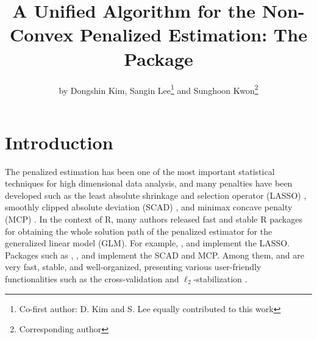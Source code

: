\title{A Unified Algorithm for the Non-Convex Penalized Estimation: The  Package}
\author{by Dongshin Kim, Sangin Lee\footnote{Co-first author: D. Kim and S. Lee equally contributed to this work} and Sunghoon Kwon\footnote{Corresponding author}}

\maketitle


\section{Introduction}

The penalized estimation has been one of the most important statistical techniques for high dimensional data analysis,
and many penalties have been developed such as the least absolute shrinkage and selection operator (LASSO) \citep{tibshirani1996regression},
smoothly clipped absolute deviation (SCAD) \citep{fan2001variable}, and minimax concave penalty (MCP) \citep{zhang2010nearly}.
In the context of R, many authors released fast and stable R packages
for obtaining the whole solution path of the penalized estimator for the generalized linear model (GLM).
For example,
 \citep{efron2004least},
 \citep{park2007l1} and
 \citep{friedman2007pathwise} implement the LASSO.
Packages such as
 \citep{zhang2010nearly},
 \citep{mazumder2011sparsenet},
 \citep{jiang2014majorization} and
 \citep{breheny2011coordinate} implement the SCAD and MCP.
Among them,  and  are very fast, stable, and well-organized,
presenting various user-friendly functionalities such as the cross-validation and $\ell_2$-stabilization \citep{zou2005regularization,huang2013balancing}.

